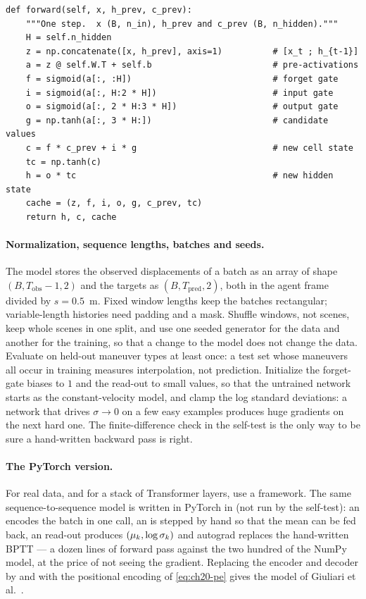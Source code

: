 \begin{lstlisting}[caption={One step of the LSTM cell (from \code{code/ch20\_prediction.py}); the backward pass follows it in the file.},label={lst:ch20-cell}]
def forward(self, x, h_prev, c_prev):
    """One step.  x (B, n_in), h_prev and c_prev (B, n_hidden)."""
    H = self.n_hidden
    z = np.concatenate([x, h_prev], axis=1)          # [x_t ; h_{t-1}]
    a = z @ self.W.T + self.b                        # pre-activations
    f = sigmoid(a[:, :H])                            # forget gate
    i = sigmoid(a[:, H:2 * H])                       # input gate
    o = sigmoid(a[:, 2 * H:3 * H])                   # output gate
    g = np.tanh(a[:, 3 * H:])                        # candidate values
    c = f * c_prev + i * g                           # new cell state
    tc = np.tanh(c)
    h = o * tc                                       # new hidden state
    cache = (z, f, i, o, g, c_prev, tc)
    return h, c, cache
\end{lstlisting}

\paragraph{Normalization, sequence lengths, batches and seeds.}
The model stores the observed displacements of a batch as an array of shape
$(B, T_{\mathrm{obs}} - 1, 2)$ and the targets as $(B, T_{\mathrm{pred}}, 2)$,
both in the agent frame divided by $s = 0.5$~m. Fixed window lengths keep the
batches rectangular; variable-length histories need padding and a mask.
Shuffle windows, not scenes, keep whole scenes in one split, and use one
seeded generator for the data and another for the training, so that a change
to the model does not change the data. Evaluate on held-out maneuver types
at least once: a test set whose maneuvers all occur in training measures
interpolation, not prediction. Initialize the forget-gate biases to $1$ and
the read-out to small values, so that the untrained network starts as the
constant-velocity model, and clamp the log standard deviations: a network
that drives $\sigma \to 0$ on a few easy examples produces huge gradients on
the next hard one. The finite-difference check in the self-test is the only
way to be sure a hand-written backward pass is right.

\paragraph{The PyTorch version.}
For real data, and for a stack of Transformer layers, use a framework. The
same sequence-to-sequence model is written in PyTorch in
 (not run by the self-test): an
 encodes the batch in one call, an  is
stepped by hand so that the mean can be fed back, an 
read-out produces $(\mathbf{\mu}_k, \log\mathbf{\sigma}_k)$ and autograd replaces
the hand-written BPTT --- a dozen lines of forward pass against the two
hundred of the NumPy model, at the price of not seeing the gradient.
Replacing the encoder and decoder by  and
 with the positional encoding of
\cref{eq:ch20-pe} gives the model of Giuliari et
al.~\cite{giuliari2021transformer}.

